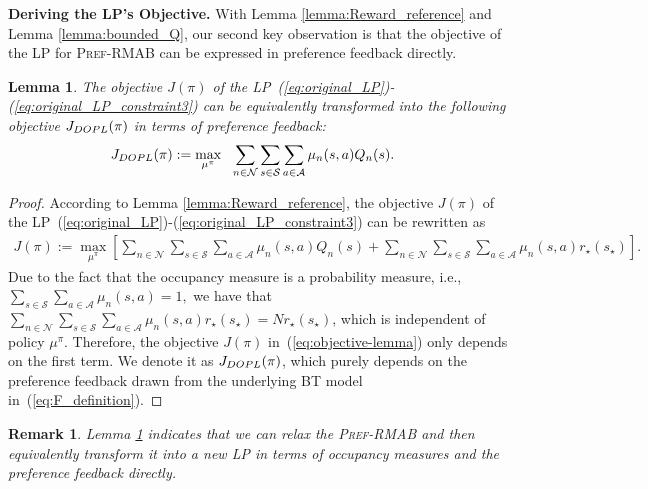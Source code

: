 \documentclass{article} %
\newcommand{\RMABPF}{\textsc{Pref-RMAB}\xspace}
\newcommand{\DOPL}{\textsc{DOPL}\xspace}
\newcommand{\cA}{\mathcal{A}}
\newcommand{\cS}{\mathcal{S}}
\newcommand{\cN}{\mathcal{N}}
\newtheorem{lemma}{Lemma}
\newtheorem{remark}{Remark}
\begin{document}
\textbf{Deriving the LP's Objective.} With Lemma \ref{lemma:Reward_reference} and Lemma \ref{lemma:bounded_Q}, our second key observation is that the objective of the LP for \RMABPF can be expressed in preference feedback directly. 
\begin{lemma}\label{lemma:preference_LP}
The objective $J(\pi)$ of the LP~(\ref{eq:original_LP})-(\ref{eq:original_LP_constraint3}) can be equivalently transformed into the following objective $J_{\DOPL}(\pi)$ in terms of preference feedback:  
\begin{align}\label{eq:LP-PF}
J_{\DOPL}(\pi):=\max_{\mu^\pi} &~~\sum_{n\in\cN}\sum_{s\in\cS}\sum_{a\in\cA} \mu_n(s,a)Q_n(s). 
\end{align}
\end{lemma}

\begin{proof}
According to Lemma \ref{lemma:Reward_reference}, the objective $J(\pi)$ of the LP~(\ref{eq:original_LP})-(\ref{eq:original_LP_constraint3}) can be rewritten as 
\begin{align}\label{eq:objective-lemma}
 J(\pi):=  \max_{\mu^\pi} \left[\sum_{n\in\cN}\sum_{s\in\cS}\sum_{a\in\cA} \mu_n(s,a)Q_n(s)+\sum_{n\in\cN}\sum_{s\in\cS}\sum_{a\in\cA} \mu_n(s,a)r_\star(s_\star)\right]. 
\end{align}
Due to the fact that the occupancy measure is a probability measure, i.e., $\sum_{s\in\cS}\sum_{a\in\cA}\mu_n(s,a)=1,$ we have that $\sum_{n\in\cN}\sum_{s\in\cS}\sum_{a\in\cA} \mu_n(s,a)r_\star(s_\star)= Nr_\star(s_\star)$, which is independent of policy $\mu^{\pi}$. Therefore, the objective  $J(\pi)$ in~(\ref{eq:objective-lemma}) only depends on the first term. We denote it as $J_{\DOPL}(\pi)$, which purely depends on the preference feedback drawn from the underlying BT model in~(\ref{eq:F_definition}). 
\end{proof}

\begin{remark}
Lemma \ref{lemma:preference_LP} indicates that we can relax the \RMABPF and then equivalently transform it into a new LP in terms of occupancy measures and the preference feedback directly. 
\end{remark}


\end{document}
